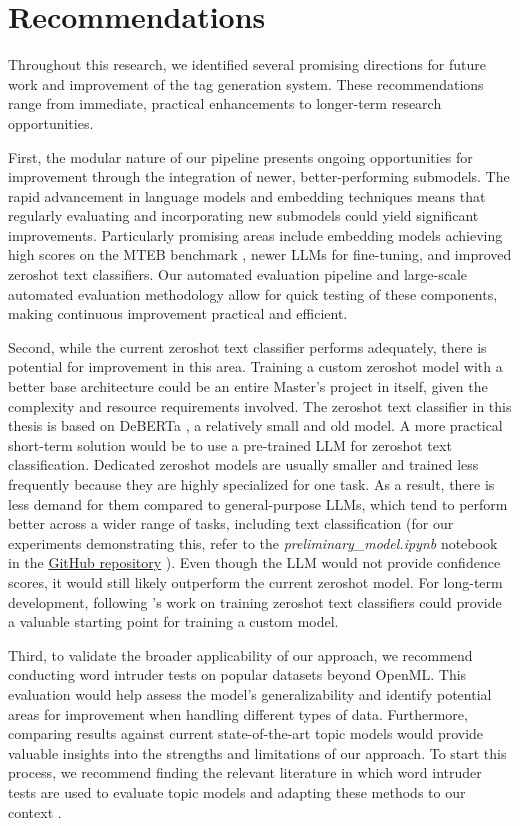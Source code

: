 \section{Recommendations}
Throughout this research, we identified several promising directions for future work and improvement of the tag generation system. These recommendations range from immediate, practical enhancements to longer-term research opportunities.

First, the modular nature of our pipeline presents ongoing opportunities for improvement through the integration of newer, better-performing submodels. The rapid advancement in language models and embedding techniques means that regularly evaluating and incorporating new submodels could yield significant improvements. Particularly promising areas include embedding models achieving high scores on the MTEB benchmark \cite{muennighoff_mteb_2023}, newer LLMs for fine-tuning, and improved zeroshot text classifiers. Our automated evaluation pipeline and large-scale automated evaluation methodology allow for quick testing of these components, making continuous improvement practical and efficient.

Second, while the current zeroshot text classifier performs adequately, there is potential for improvement in this area. Training a custom zeroshot model with a better base architecture could be an entire Master's project in itself, given the complexity and resource requirements involved. The zeroshot text classifier in this thesis is based on DeBERTa \cite{he_deberta_2021}, a relatively small and old model. A more practical short-term solution would be to use a pre-trained LLM for zeroshot text classification. Dedicated zeroshot models are usually smaller and trained less frequently because they are highly specialized for one task. As a result, there is less demand for them compared to general-purpose LLMs, which tend to perform better across a wider range of tasks, including text classification (for our experiments demonstrating this, refer to the \textit{preliminary\_model.ipynb} notebook in the \href{https://github.com/ivangermanov/openml-tags}{GitHub repository} \cite{germanov_topic_modeling_of_2024} ). Even though the LLM would not provide confidence scores, it would still likely outperform the current zeroshot model. For long-term development, following \citet{laurer_building_2024}'s work on training zeroshot text classifiers could provide a valuable starting point for training a custom model.

Third, to validate the broader applicability of our approach, we recommend conducting word intruder tests on popular datasets beyond OpenML. This evaluation would help assess the model's generalizability and identify potential areas for improvement when handling different types of data. Furthermore, comparing results against current state-of-the-art topic models would provide valuable insights into the strengths and limitations of our approach. To start this process, we recommend finding the relevant literature in which word intruder tests are used to evaluate topic models and adapting these methods to our context \cite{chang_reading_2009,lau_machine_2014,hoyle_is_2021,newman_evaluating_2010,mimno_optimizing_nodate,musil_exploring_2024,bhatia_automatic_2017,lim_large-scale_2023}.

